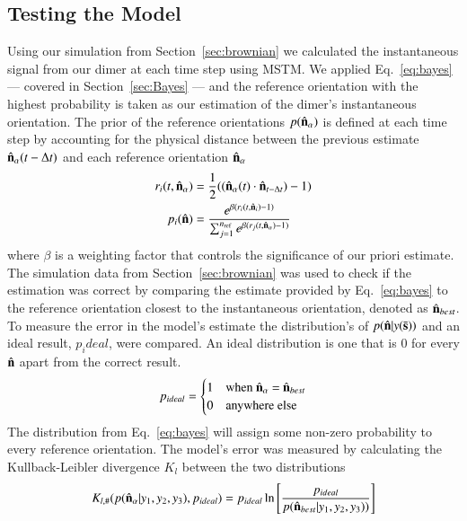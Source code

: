 \documentclass[final, 3p]{elsarticle}
\begin{document}
\subsection{Testing the Model}
\label{sec:test}


Using our simulation from Section~\ref{sec:brownian} we calculated the
instantaneous signal from our dimer at each time step using MSTM.  We
applied Eq.~\eqref{eq:bayes} --- covered in Section~\ref{sec:Bayes} ---
and the reference orientation with the highest probability is taken as
our estimation of the dimer's instantaneous orientation.  The prior of
the reference orientations $p(\hat{\bf n}_\alpha)$ is defined at each
time step by accounting for the physical distance between the previous
estimate $\hat{\bf n}_{\alpha}(t - \Delta t)$ and each reference
orientation $\hat{\bf n}_\alpha$
\begin{align}
  r_i(t, \hat{\bf n}_\alpha)
  &= \frac{1}{2}((\hat{\bf n}_{\alpha}(t) \cdot \hat{\bf n}_{t-\Delta t})-1)
  \\
  p_i(\hat{\bf n})
  &= \frac{e^{\beta (r_i(t,\hat{\bf n}_i)-1)}}
{\sum_{j=1}^{n_{\rm ref}}e^{\beta(r_j(t, \hat{\bf n}_\alpha)-1)}}
\end{align}
where $\beta$ is a weighting factor that controls the significance of
our priori estimate. The simulation data from Section~\ref{sec:brownian}
was used to check if the estimation was correct by comparing the
estimate provided by Eq.~\eqref{eq:bayes} to the reference orientation
closest to the instantaneous orientation, denoted as
$\hat{\bf n}_{best}$.  To measure the error in the model's estimate
the distribution's of $p(\hat{\bf n}| y(\bar{\bf s}))$ and an
ideal result, $p_ideal$, were compared.  An ideal distribution is one
that is 0 for every $\hat{\bf n}$ apart from the correct result.
\begin{align}
p_{ideal} = 
\begin{cases}
	1 & \text{when $\hat{\bf n}_\alpha$ = $\hat{\bf n}_{best}$}\\
	0 & \text{anywhere else}
\end{cases}
\end{align}
The distribution from Eq.~\eqref{eq:bayes} will assign some non-zero
probability to every reference orientation.  The model's error was
measured by calculating the Kullback-Leibler divergence $K_l$ between
the two distributions
\begin{align}
  K_{l, \#}(p(\hat{\bf n}_\alpha| y_1, y_2, y_3), p_{ideal})
  = p_{ideal}\ln \left[\frac{p_{ideal}}{p(\hat{\bf n}_{best}| y_1,y_2,y_3))}
\right]
\end{align}
\end{document}
